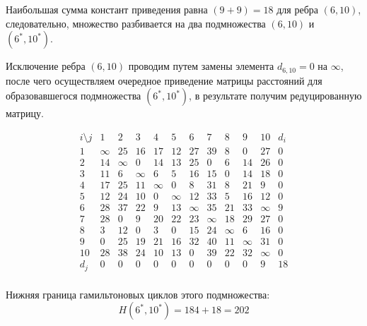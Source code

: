 \documentclass{article}
\begin{document}
Наибольшая сумма констант приведения равна $(9 + 9) = 18$ для ребра $(6,10)$, следовательно, множество разбивается на два подмножества $(6,10)$ и $(6^*,10^*)$.


Исключение ребра $(6,10)$ проводим путем замены элемента $d_{6,10} = 0$ на $\infty$, после чего осуществляем очередное приведение матрицы расстояний для образовавшегося подмножества $(6^*,10^*)$, в результате получим редуцированную матрицу.

\[
    \begin{array}{c|cccccccccc|c}
        i \setminus j & 1      & 2      & 3      & 4      & 5      & 6      & 7      & 8      & 9      & 10     & d_i \\
        \hline
        1             & \infty & 25     & 16     & 17     & 12     & 27     & 39     & 8      & 0      & 27     & 0   \\
        2             & 14     & \infty & 0      & 14     & 13     & 25     & 0      & 6      & 14     & 26     & 0   \\
        3             & 11     & 6      & \infty & 6      & 5      & 16     & 15     & 0      & 14     & 18     & 0   \\
        4             & 17     & 25     & 11     & \infty & 0      & 8      & 31     & 8      & 21     & 9      & 0   \\
        5             & 12     & 24     & 10     & 0      & \infty & 12     & 33     & 5      & 16     & 12     & 0   \\
        6             & 28     & 37     & 22     & 9      & 13     & \infty & 35     & 21     & 33     & \infty & 9   \\
        7             & 28     & 0      & 9      & 20     & 22     & 23     & \infty & 18     & 29     & 27     & 0   \\
        8             & 3      & 12     & 0      & 3      & 0      & 15     & 24     & \infty & 6      & 16     & 0   \\
        9             & 0      & 25     & 19     & 21     & 16     & 32     & 40     & 11     & \infty & 31     & 0   \\
        10            & 28     & 38     & 24     & 10     & 13     & 0      & 39     & 22     & 32     & \infty & 0   \\
        \hline
        d_j           & 0      & 0      & 0      & 0      & 0      & 0      & 0      & 0      & 0      & 9      & 18  \\
    \end{array}
\]

Нижняя граница гамильтоновых циклов этого подмножества:
\[
    H(6^*,10^*) = 184 + 18 = 202
\]
\end{document}
